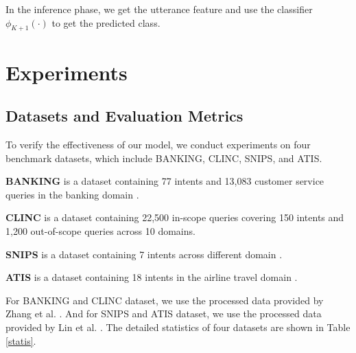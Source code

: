 \documentclass[journal]{IEEEtran}
\begin{document}
In the inference phase, we get the utterance feature and use the classifier $\phi_{K+1}(\cdot)$ to get the predicted class.

\section{Experiments}

\subsection{Datasets and Evaluation Metrics}
To verify the effectiveness of our model, we conduct experiments on four benchmark datasets, which include BANKING, CLINC, SNIPS, and ATIS.

\textbf{BANKING} is a dataset containing 77 intents and 13,083 customer service queries in the banking domain \cite{banking}.

\textbf{CLINC} is a dataset containing 22,500 in-scope queries covering 150 intents and 1,200 out-of-scope queries across 10 domains\cite{DBLP:conf/emnlp/LarsonMPCLHKLLT19}.


\textbf{SNIPS} is a dataset containing 7 intents across different domain \cite{DBLP:journals/corr/abs-1805-10190}.

\textbf{ATIS} is a dataset containing 18 intents in the airline travel domain \cite{DBLP:conf/naacl/HemphillGD90}.

For BANKING and CLINC dataset, we use the processed data provided by Zhang et al. \cite{zhang21}.
And for SNIPS and ATIS dataset, we use the processed data provided by Lin et al. \cite{Lin19}.
The detailed statistics of four datasets are shown in Table \ref{statis}.
\end{document}
